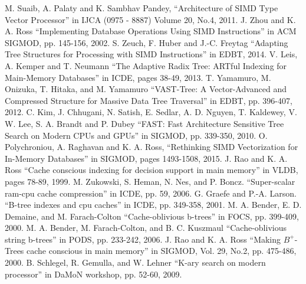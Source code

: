 \documentclass[conference]{IEEEtran}
\begin{document}
\begin{thebibliography}{00}
M. Suaib, A. Palaty and K. Sambhav Pandey, ``Architecture of SIMD Type Vector Processor'' in IJCA (0975 - 8887) Volume 20, No.4, 2011.
 J. Zhou and K. A. Ross  ``Implementing Database Operations Using SIMD Instructions'' in ACM SIGMOD, pp. 145-156, 2002.%
 S. Zeuch, F. Huber and J.-C. Freytag  ``Adapting Tree Structures for Processing with SIMD Instructions'' in EDBT, 2014.%
 V. Leis, A. Kemper and T. Neumann ``The Adaptive Radix Tree: ARTful Indexing for Main-Memory Databases'' in ICDE, pages 38-49, 2013.
 T. Yamamuro, M. Onizuka, T. Hitaka, and M. Yamamuro ``VAST-Tree: A Vector-Advanced and Compressed Structure for Massive Data Tree Traversal'' in EDBT, pp. 396-407, 2012.%
 C. Kim, J. Chhugani, N. Satish, E. Sedlar, A. D. Nguyen, T. Kaldewey, V. W. Lee, S. A. Brandt and P. Dubey ``FAST: Fast Architecture Sensitive Tree Search on Modern CPUs and GPUs'' in SIGMOD, pp. 339-350, 2010.%
O. Polychroniou, A. Raghavan and K. A. Ross, ``Rethinking SIMD Vectorization for In-Memory Databases'' in SIGMOD, pages 1493-1508, 2015.%
 J. Rao and K. A. Ross ``Cache conscious indexing for decision support in main memory'' in VLDB, pages 78-89, 1999.
  M. Zukowski, S. Heman, N. Nes, and P. Boncz. ``Super-scalar ram-cpu cache compression'' in ICDE, pp. 59, 2006.
 G. Graefe and P.-A. Larson. ``B-tree indexes and cpu caches'' in ICDE, pp. 349-358, 2001.
 M. A. Bender, E. D. Demaine, and M. Farach-Colton ``Cache-oblivious b-trees'' in FOCS, pp. 399-409, 2000.
 M. A. Bender, M. Farach-Colton, and B. C. Kuszmaul ``Cache-oblivious string b-trees'' in PODS, pp. 233-242, 2006.
 J. Rao and K. A. Ross ``Making $B^+$-Trees cache conscious in main memory'' in SIGMOD, Vol. 29, No.2, pp. 475-486, 2000.
 B. Schlegel, R. Gemulla, and W. Lehner ``K-ary search on modern processor'' in DaMoN workshop, pp. 52-60, 2009.
\end{thebibliography}
\end{document}

